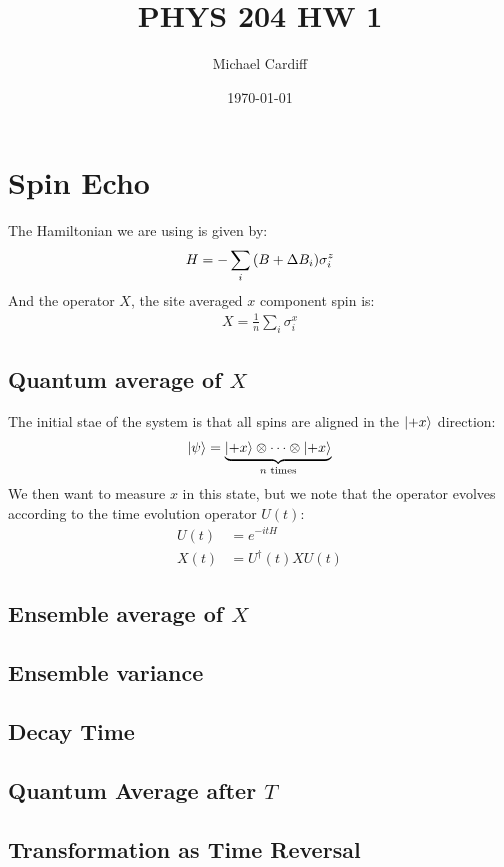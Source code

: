 \documentclass[12pt]{article}
\title{\vspace{-3em}PHYS 204 HW 1}
\author{Michael Cardiff}
\date{\today}
\begin{document}
\maketitle

\section{Spin Echo}
The Hamiltonian we are using is given by:
\begin{align*}
  H=-\sum_i\qty(B+\Delta B_i)\sigma_i^z
\end{align*}
And the operator $X$, the site averaged $x$ component spin is:
\begin{align*}
  X=\frac1n\sum_i\sigma_i^x
\end{align*}
\subsection{Quantum average of $X$}
The initial stae of the system is that all spins are aligned in the $\ket{+x}$ direction:
\begin{align*}
  \ket{\psi}=\underbrace{\ket{+x}\otimes\cdots\otimes\ket{+x}}_{n\text{ times}}
\end{align*}
We then want to measure $x$ in this state, but we note that the operator evolves according to the time evolution operator $U(t)$:
\begin{align*}
  U(t)&=e^{-itH}\\
  X(t)&=U^\dag(t)XU(t)
\end{align*}
\subsection{Ensemble average of $X$}

\subsection{Ensemble variance}

\subsection{Decay Time}

\subsection{Quantum Average after $T$}

\subsection{Transformation as Time Reversal}
\end{document}
